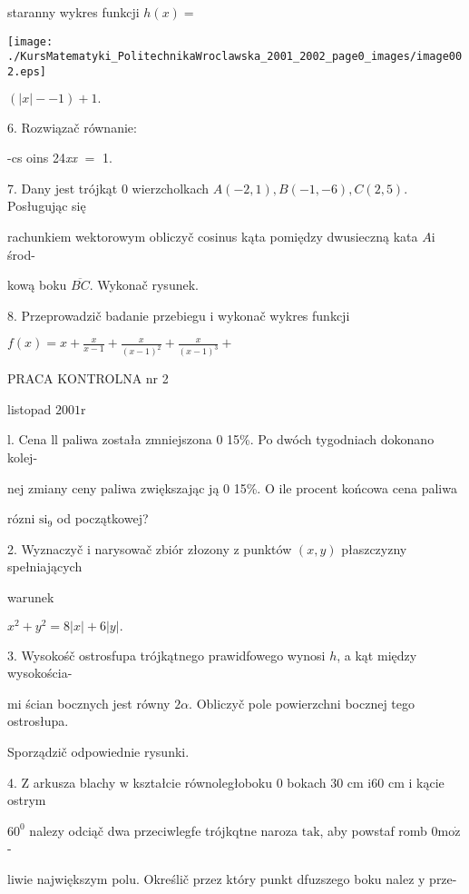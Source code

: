 \documentclass[a4paper,12pt]{article}
\begin{document}
staranny wykres funkcji $h(x) =$
\begin{center}
\texttt{[image: ./KursMatematyki\_PolitechnikaWroclawska\_2001\_2002\_page0\_images/image002.eps]}
\end{center}
$(|x|-- 1)+1.$

6. Rozwiązač równanie:

-cs  oins 24{\it xx} $=$ 1.

7. Dany jest trójkąt $0$ wierzcholkach $A(-2,1), B(-1,-6), C(2,5)$. Posługując się

rachunkiem wektorowym obliczyč cosinus kąta pomiędzy dwusieczną kata $A\mathrm{i}$ środ-

kową boku $\overline{BC}$. Wykonač rysunek.

8. Przeprowadzič badanie przebiegu $\mathrm{i}$ wykonač wykres funkcji

$f(x)=x+\displaystyle \frac{x}{x-1}+\frac{x}{(x-1)^{2}}+\frac{x}{(x-1)^{3}}+$




PRACA KONTROLNA nr 2

listopad $2001\mathrm{r}$

l. Cena ll paliwa została zmniejszona $0$ 15\%. Po dwóch tygodniach dokonano kolej-

nej zmiany ceny paliwa zwiększając ją $0$ 15\%. $\mathrm{O}$ ile procent końcowa cena paliwa

rózni $\mathrm{s}\mathrm{i}_{9}$ od początkowej?

2. Wyznaczyč $\mathrm{i}$ narysowač zbiór złozony $\mathrm{z}$ punktów $(x,y)$ płaszczyzny spełniających

warunek

$x^{2}+y^{2}=8|x|+6|y|.$

3. Wysokośč ostrosfupa trójkątnego prawidfowego wynosi $h$, a kąt między wysokościa-

mi ścian bocznych jest równy $ 2\alpha$. Obliczyč pole powierzchni bocznej tego ostrosłupa.

Sporządzič odpowiednie rysunki.

4. $\mathrm{Z}$ arkusza blachy $\mathrm{w}$ kształcie równoległoboku $0$ bokach 30 cm $\mathrm{i}60$ cm $\mathrm{i}$ kącie ostrym

$60^{0}$ nalezy odciąč dwa przeciwlegfe trójkqtne naroza $\mathrm{t}\mathrm{a}\mathrm{k}$, aby powstaf romb $0\mathrm{m}\mathrm{o}\dot{\mathrm{z}}$-

liwie największym polu. Określič przez który punkt dfuzszego boku nalez $\mathrm{y}$ prze-
\end{document}
